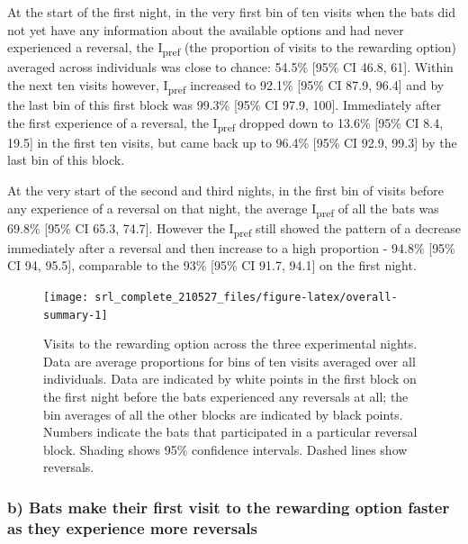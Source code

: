 \documentclass[
]{article}
\begin{document}
At the start of the first night, in the very first bin of ten visits when the bats did not yet have any information about the available options and had never experienced a reversal, the I\textsubscript{pref} (the proportion of visits to the rewarding option) averaged across individuals was close to chance: 54.5\% {[}95\% CI 46.8, 61{]}. Within the next ten visits however, I\textsubscript{pref} increased to 92.1\% {[}95\% CI 87.9, 96.4{]} and by the last bin of this first block was 99.3\% {[}95\% CI 97.9, 100{]}. Immediately after the first experience of a reversal, the I\textsubscript{pref} dropped down to 13.6\% {[}95\% CI 8.4, 19.5{]} in the first ten visits, but came back up to 96.4\% {[}95\% CI 92.9, 99.3{]} by the last bin of this block.

At the very start of the second and third nights, in the first bin of visits before any experience of a reversal on that night, the average I\textsubscript{pref} of all the bats was 69.8\% {[}95\% CI 65.3, 74.7{]}. However the I\textsubscript{pref} still showed the pattern of a decrease immediately after a reversal and then increase to a high proportion - 94.8\% {[}95\% CI 94, 95.5{]}, comparable to the 93\% {[}95\% CI 91.7, 94.1{]} on the first night.



\begin{figure}[H]

{\centering \texttt{[image: srl\_complete\_210527\_files/figure-latex/overall-summary-1]} 

}

\caption{Visits to the rewarding option across the three experimental nights. Data are average proportions for bins of ten visits averaged over all individuals. Data are indicated by white points in the first block on the first night before the bats experienced any reversals at all; the bin averages of all the other blocks are indicated by black points. Numbers indicate the bats that participated in a particular reversal block. Shading shows 95\% confidence intervals. Dashed lines show reversals.}\label{fig:overall-summary}
\end{figure}

\hypertarget{b-bats-make-their-first-visit-to-the-rewarding-option-faster-as-they-experience-more-reversals}{%
\subsubsection{b) Bats make their first visit to the rewarding option faster as they experience more reversals}\label{b-bats-make-their-first-visit-to-the-rewarding-option-faster-as-they-experience-more-reversals}}
\end{document}

